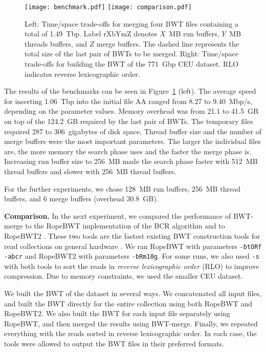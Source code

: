 \documentclass[smallabstract,smallcaptions]{dccpaper}
\newcommand{\BWT}{\textsf{BWT}}
\newcommand{\BWTmerge}{\textsf{BWT\nobreakdash-merge}}
\newcommand{\ropebwt}{\textsf{RopeBWT}}
\newcommand{\ropebwtii}{\textsf{RopeBWT2}}
\newcommand{\CEU}{\textsf{CEU}}
\begin{document}
\begin{figure}[t!]
\begin{center}
\texttt{[image: benchmark.pdf]}%
\hspace{-0.3in}%
\texttt{[image: comparison.pdf]}
\end{center}
\caption{Left: Time/space trade-offs for merging four \BWT{} files containing a total of 1.49~Tbp. Label rXbYmZ denotes $X$~MB run buffers, $Y$~MB threads buffers, and $Z$ merge buffers. The dashed line represents the total size of the last pair of \BWT{}s to be merged. Right: Time/space trade-offs for building the \BWT{} of the 771~Gbp \CEU{} dataset. RLO indicates reverse lexicographic order.}\label{fig:benchmark}
\end{figure}

The results of the benchmarks can be seen in Figure~\ref{fig:benchmark} (left). The average speed for inserting 1.06~Tbp into the initial file AA ranged from 8.27 to 9.40~Mbp/s, depending on the parameter values. Memory overhead was from 21.1 to 41.5~GB on top of the 124.2~GB required by the last pair of \BWT{}s. The temporary files required 287 to 306~gigabytes of disk space. Thread buffer size and the number of merge buffers were the most important parameters. The larger the individual files are, the more memory the search phase uses and the faster the merge phase is. Increasing run buffer size to 256~MB made the search phase faster with 512~MB thread buffers and slower with 256~MB thread buffers.

For the further experiments, we chose 128~MB run buffers, 256~MB thread buffers, and 6 merge buffers (overhead 30.8~GB).

\smallbreak\noindent\textbf{Comparison.} In the next experiment, we compared the performance of \BWTmerge{} to the \ropebwt{} \cite{Li2011-2013} implementation of the BCR algorithm \cite{Bauer2013} and to \ropebwtii{} \cite{Li2014a}. These two tools are the fastest existing \BWT{} construction tools for read collections on general hardware \cite{Li2014a}. We ran \ropebwt{} with parameters \texttt{-btORf -abcr} and \ropebwtii{} with parameters \texttt{-bRm10g}. For some runs, we also used \texttt{-s} with both tools to sort the reads in \emph{reverse lexicographic order} (RLO) to improve compression. Due to memory constraints, we used the smaller \CEU{} dataset.

We built the \BWT{} of the dataset in several ways. We concatenated all input files, and built the \BWT{} directly for the entire collection using both \ropebwt{} and \ropebwtii{}. We also built the \BWT{} for each input file separately using \ropebwt{}, and then merged the results using \BWTmerge{}. Finally, we repeated everything with the reads sorted in reverse lexicographic order. In each case, the tools were allowed to output the \BWT{} files in their preferred formats.
\end{document}
